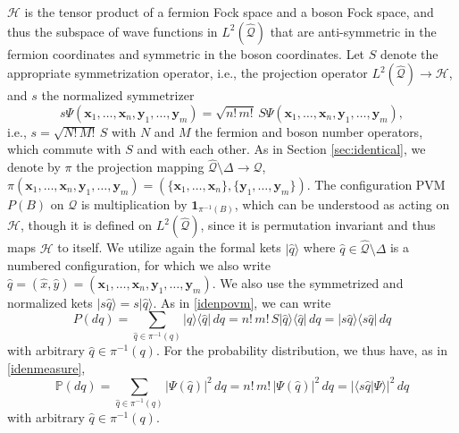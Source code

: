 \documentclass[12pt]{article}
\newcommand{\1}{\mathbf{1}} %
\newcommand{\Hilbert}{\mathscr{H}}
\renewcommand{\sp}[2]{\langle #1 | #2 \rangle} %
\newcommand{\conf}{\mathcal{Q}} %
\newcommand{\measure}{\mathbb{P}} %
\newcommand{\pov}{{P}}%
\newcommand{\covering}{\pi} %
\newcommand{\vx}{{\boldsymbol x}} %
\newcommand{\vy}{{\boldsymbol y}}
\begin{document}
$\Hilbert$ is the tensor product of a fermion Fock space and a boson
Fock space, and thus the subspace of wave functions in
$L^2(\hat{\conf})$ that are anti-symmetric in the fermion coordinates
and symmetric in the boson coordinates. Let $S$ denote the appropriate
symmetrization operator, i.e., the projection operator
$L^2(\hat{\conf}) \to \Hilbert$, and $s$ the normalized symmetrizer
\begin{equation}\label{sdef}
   s\Psi(\vx_1, \ldots, \vx_n,\vy_1, \ldots, \vy_m) = \sqrt{n!\, m!} \,
   S\Psi(\vx_1, \ldots, \vx_n,\vy_1, \ldots, \vy_m),
\end{equation}
i.e., $s = \sqrt{N! \, M!} \, S$ with $N$ and $M$ the fermion and
boson number operators, which commute with $S$ and with each other.
As in Section \ref{sec:identical}, we denote by $\covering$ the
projection mapping $\hat{\conf} \setminus \Delta \to \conf$,
$\covering(\vx_1, \ldots, \vx_n,\vy_1, \ldots, \vy_m) = (\{\vx_1,
\ldots,\vx_n\}, \{\vy_1, \ldots, \vy_m\})$.  The configuration PVM
$\pov(B)$ on $\conf$  is multiplication by
$\1_{\covering^{-1}(B)}$, which can be understood as acting on
$\Hilbert$, though it is defined on $L^2(\hat{\conf})$, since it is
permutation invariant and thus maps $\Hilbert$ to itself.  We utilize
again the formal kets $|\hat{q}\rangle$ where $\hat{q} \in \hat{\conf}
\setminus \Delta$ is a numbered configuration, for which we also write
$\hat{q} = (\hat{x},\hat{y}) = (\vx_1, \ldots, \vx_n,\vy_1, \ldots,
\vy_m)$. We also use the symmetrized and normalized kets $|s\hat{q}
\rangle = s|\hat{q} \rangle$. As   in \eqref{idenpovm}, we can write
\begin{equation}\label{crea1povm}
   \pov(dq) = \sum_{\hat{q} \in \covering^{-1}(q)} |\hat{q} \rangle
   \langle \hat{q}| \, dq = n!\, m! \, S |\hat{q} \rangle \langle
   \hat{q}| \, dq = |s\hat{q} \rangle \langle s\hat{q}| \, dq
\end{equation}
with arbitrary $\hat{q} \in \covering^{-1}(q)$. For the probability
distribution, we thus have, as  in \eqref{idenmeasure},
\begin{equation}\label{crea1measure}
   \measure(dq) = \sum_{\hat{q} \in \covering^{-1}(q)}
   |\Psi(\hat{q})|^2 \, dq  = n!\, m! \, |\Psi(\hat{q})|^2 \, dq =
   |\sp{s\hat{q}}{\Psi}|^2 \, dq
\end{equation}
with arbitrary $\hat{q} \in \covering^{-1}(q)$.
\end{document}
